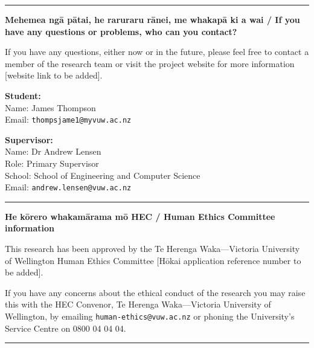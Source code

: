 \documentclass[11pt, a4paper]{article}
\begin{document}
\newpage

\noindent\textcolor{rulered}{\rule{\textwidth}{0.4pt}}

\noindent\textbf{Mehemea ng\={a} p\={a}tai, he raruraru r\={a}nei, me whakap\={a}
ki a wai / If you have any questions or problems, who can you contact?}

\smallskip

\noindent If you have any questions, either now or in the future, please feel free to contact a member of the research team or visit the project website for more information [website link to be added].

\bigskip

\noindent
\begin{minipage}[t]{0.46\textwidth}
  \textbf{Student:}\\[4pt]
  Name: James Thompson\\[4pt]
  Email: \texttt{thompsjame1@myvuw.ac.nz}\\[4pt]
\end{minipage}
\hfill
\begin{minipage}[t]{0.46\textwidth}
  \textbf{Supervisor:}\\[4pt]
  Name: Dr Andrew Lensen\\[4pt]
  Role: Primary Supervisor\\[4pt]
  School: School of Engineering and Computer Science\\[4pt]
  Email: \texttt{andrew.lensen@vuw.ac.nz}
\end{minipage}

\bigskip

\noindent\textcolor{rulered}{\rule{\textwidth}{0.4pt}}

\noindent\textbf{He k\={o}rero whakam\={a}rama m\={o} HEC / Human Ethics Committee information}

\medskip

This research has been approved by the Te Herenga Waka---Victoria University of
Wellington Human Ethics Committee [H\={o}kai application reference number to be added].

\noindent If you have any concerns about the ethical conduct of the research you
may raise this with the HEC Convenor, Te Herenga Waka---Victoria University of
Wellington, by emailing \texttt{human-ethics@vuw.ac.nz} or phoning the
University's Service Centre on 0800 04 04 04.

\noindent\textcolor{rulered}{\rule{\textwidth}{0.4pt}}
\end{document}
